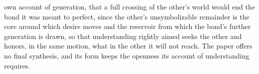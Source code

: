 own account of generation, that a full crossing of the other's world would end the bond it was meant to perfect, since the other's unsymbolizable remainder is the core around which desire moves and the reservoir from which the bond's further generation is drawn, so that understanding rightly aimed seeks the other and honors, in the same motion, what in the other it will not reach. The paper offers no final synthesis, and its form keeps the openness its account of understanding requires.
